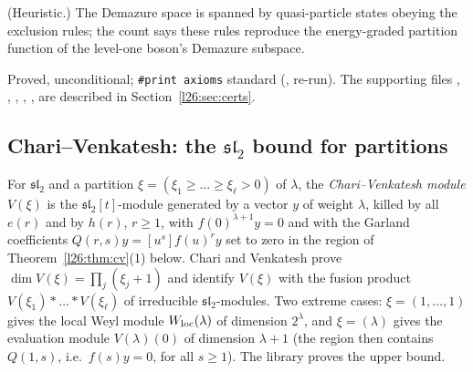 \begin{physics}
(Heuristic.) The Demazure space is spanned by quasi-particle states obeying the exclusion rules; the count says these rules reproduce
the energy-graded partition function of the level-one boson's Demazure subspace.
\end{physics}

\begin{status}
Proved, unconditional; \texttt{\#print axioms} standard (,  re-run). The
supporting files , , , , ,  are
described in Section~\ref{l26:sec:certs}.
\end{status}

\subsection{Chari--Venkatesh: the $\mathfrak{sl}_2$ bound for partitions}

For $\mathfrak{sl}_2$ and a partition $\xi=(\xi_1\ge\dots\ge\xi_\ell>0)$ of $\lambda$, the \emph{Chari--Venkatesh module} $V(\xi)$ is
the $\mathfrak{sl}_2[t]$-module generated by a vector $y$ of weight $\lambda$, killed by all $e(r)$ and by $h(r)$, $r\ge1$, with
$f(0)^{\lambda+1}y=0$ and with the Garland coefficients $Q(r,s)y=[u^s]f(u)^ry$ set to zero in the region of
Theorem~\ref{l26:thm:cv}(1) below. Chari and Venkatesh prove $\dim V(\xi)=\prod_j(\xi_j+1)$ and identify $V(\xi)$ with the fusion
product $V(\xi_1)*\dots*V(\xi_\ell)$ of irreducible $\mathfrak{sl}_2$-modules. Two extreme cases: $\xi=(1,\dots,1)$ gives the
local Weyl module $W_{\mathrm{loc}}(\lambda)$ of dimension $2^\lambda$, and $\xi=(\lambda)$ gives the evaluation module $V(\lambda)(0)$
of dimension $\lambda+1$ (the region then contains $Q(1,s)$, i.e.\ $f(s)y=0$, for all $s\ge1$). The library proves the upper bound.


